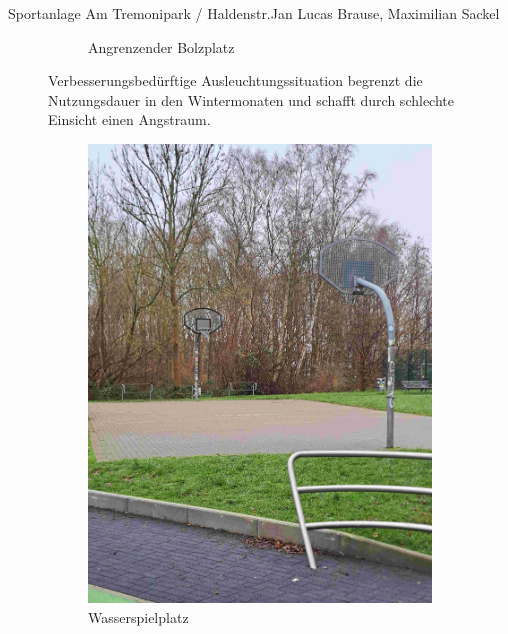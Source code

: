 \documentclass{../../templates/amendment}
\begin{document}
\begin{boxed}{Sportanlage Am Tremonipark / Haldenstr.}{Jan Lucas Brause, Maximilian Sackel}
\begin{figure}[htpb]
\begin{subfigure}{0.5\textwidth}
\begin{center}
                \caption{Angrenzender Bolzplatz}%
            \end{center}
        \end{subfigure}
        \caption{Verbesserungsbedürftige Ausleuchtungssituation begrenzt die
            Nutzungsdauer in den Wintermonaten und schafft durch schlechte Einsicht
        einen Angstraum.}
    \end{figure}

    \begin{figure}[htpb]
        \centering
        \begin{subfigure}[]{0.32\textwidth}
            \begin{center}
                \includegraphics[width=\linewidth]{pictures/photo2.jpg}
                \caption{Wasserspielplatz}%
            \end{center}
        \end{subfigure}
        \begin{subfigure}[]{0.32\textwidth}

\end{subfigure}
\end{figure}
\end{boxed}
\end{document}
